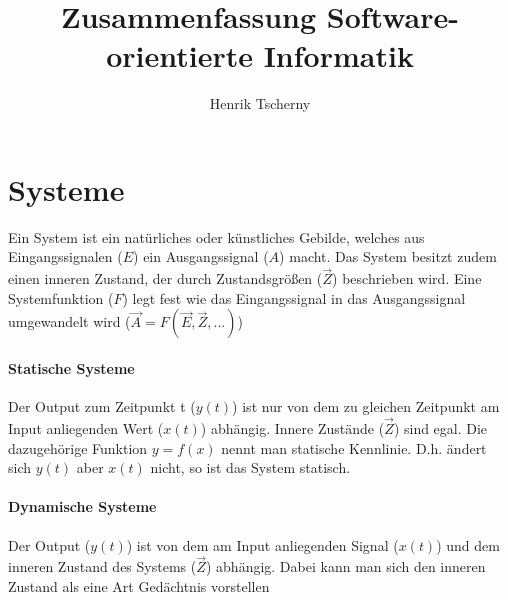 \documentclass[12pt,a4paper]{article}
\title{Zusammenfassung Software-orientierte Informatik}
\author{Henrik Tscherny}
\begin{document}
\maketitle
\tableofcontents
\newpage

\section{Systeme}
Ein System ist ein natürliches oder künstliches Gebilde, welches aus Eingangssignalen ($E$) ein Ausgangssignal ($A$) macht. Das System besitzt zudem einen inneren Zustand, der durch Zustandsgrößen ($\vec{Z}$) beschrieben wird. Eine Systemfunktion ($F$) legt fest wie das Eingangssignal in das Ausgangssignal umgewandelt wird ($\vec{A} = F(\vec{E}, \vec{Z},...)$)

\paragraph{Statische Systeme}
Der Output zum Zeitpunkt t ($y(t)$) ist nur von dem zu gleichen Zeitpunkt am Input anliegenden Wert ($x(t)$) abhängig. Innere Zustände ($\vec{Z}$) sind egal. Die dazugehörige Funktion $y=f(x)$ nennt man statische Kennlinie.
D.h. ändert sich $y(t)$ aber $x(t)$ nicht, so ist das System statisch.

\paragraph{Dynamische Systeme}
Der Output ($y(t)$) ist von dem am Input anliegenden Signal ($x(t)$) und dem inneren Zustand des Systems ($\vec{Z}$) abhängig. Dabei kann man sich den inneren Zustand als eine Art Gedächtnis vorstellen
\end{document}
